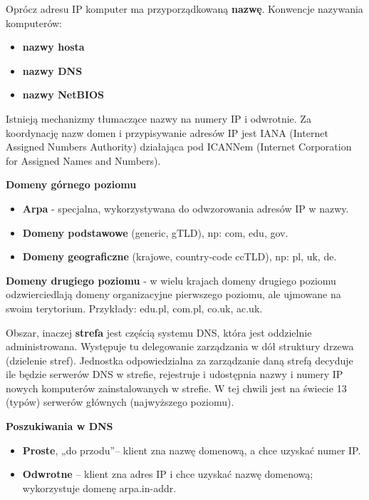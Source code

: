 \documentclass[../main.tex]{subfiles}
\begin{document}
    Oprócz adresu IP komputer ma
    przyporządkowaną \textbf{nazwę}. Konwencje nazywania komputerów:
    \begin{itemize}
        \item \textbf{nazwy hosta}
        \item \textbf{nazwy DNS}
        \item \textbf{nazwy NetBIOS}
    \end{itemize}

    Istnieją mechanizmy tłumaczące nazwy na numery IP i odwrotnie.
    Za koordynację nazw domen i przypisywanie adresów IP jest IANA (Internet Assigned Numbers
    Authority) działająca pod ICANNem (Internet
    Corporation for Assigned Names and Numbers).

    \textbf{Domeny górnego poziomu}
    \begin{itemize}
        \item \textbf{Arpa} - specjalna, wykorzystywana do odwzorowania adresów IP w nazwy.
        \item \textbf{Domeny podstawowe} (generic, gTLD), np: com, edu, gov.
        \item \textbf{Domeny geograficzne} (krajowe, country-code ccTLD), np: pl, uk, de.
    \end{itemize}

    \textbf{Domeny drugiego poziomu} - w wielu krajach domeny drugiego poziomu odzwierciedlają
    domeny organizacyjne pierwszego poziomu, ale ujmowane na swoim terytorium. Przykłady:
    edu.pl, com.pl, co.uk, ac.uk.

    Obszar, inaczej \textbf{strefa} jest częścią systemu DNS, która jest oddzielnie administrowana.
    Występuje tu delegowanie zarządzania w dół struktury drzewa (dzielenie stref). Jednostka
    odpowiedzialna za zarządzanie daną strefą decyduje ile będzie serwerów DNS w strefie,
    rejestruje i udostępnia nazwy i numery IP nowych komputerów zainstalowanych w strefie.
    W tej chwili jest na świecie 13 (typów) serwerów głównych (najwyższego poziomu).

    \textbf{Poszukiwania w DNS}
    \begin{itemize}
        \item \textbf{Proste}, „do przodu”– klient zna nazwę domenową, a chce uzyskać numer IP.
        \item \textbf{Odwrotne} – klient zna adres IP i chce uzyskać nazwę domenową; wykorzystuje domenę arpa.in-addr.
    \end{itemize}
\end{document}
